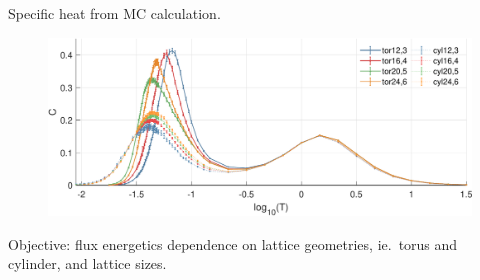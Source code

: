 \begin{frame}{Specific heat from MC calculation.}
    
    \begin{figure}
        \centering
        \begin{minipage}[l]{.8\textwidth}
            \includegraphics[width = 1\textwidth]{figures/Cv_all.pdf}
        \end{minipage}
    \end{figure}
    Objective: flux energetics dependence on lattice geometries, ie.\ torus and cylinder, and lattice sizes. 
\end{frame}


